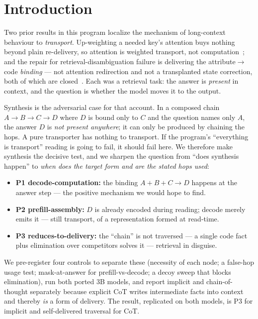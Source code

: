 \documentclass[11pt]{article}
\begin{document}
\section{Introduction}
\label{sec:intro}

Two prior results in this program localize the mechanism of long-context behaviour to
\emph{transport}. Up-weighting a needed key's attention buys nothing beyond plain
re-delivery, so attention is weighted transport, not
computation~\cite{paper3retention}; and the repair for retrieval-disambiguation
failure is delivering the attribute$\to$code \emph{binding} --- not attention
redirection and not a transplanted state correction, both of which are
closed~\cite{paper4arc}. Each was a retrieval task: the answer is \emph{present} in
context, and the question is whether the model moves it to the output.

Synthesis is the adversarial case for that account. In a composed chain
$A\!\to\!B\!\to\!C\!\to\!D$ where $D$ is bound only to $C$ and the question names only
$A$, the answer $D$ is \emph{not present anywhere}; it can only be produced by
chaining the hops. A pure transporter has nothing to transport. If the program's
``everything is transport'' reading is going to fail, it should fail here. We
therefore make synthesis the decisive test, and we sharpen the question from ``does
synthesis happen'' to \emph{when does the target form and are the stated hops used}:
\begin{itemize}
\item \textbf{P1 decode-computation:} the binding $A{+}B{+}C\!\to\!D$ happens at the
answer step --- the positive mechanism we would hope to find.
\item \textbf{P2 prefill-assembly:} $D$ is already encoded during reading; decode
merely emits it --- still transport, of a representation formed at read-time.
\item \textbf{P3 reduces-to-delivery:} the ``chain'' is not traversed --- a single
code fact plus elimination over competitors solves it --- retrieval in disguise.
\end{itemize}
We pre-register four controls to separate these (necessity of each node; a
false-hop usage test; mask-at-answer for prefill-vs-decode; a decoy sweep that blocks
elimination), run both ported 3B models, and report implicit and chain-of-thought
separately because explicit CoT writes intermediate facts into context and thereby
\emph{is} a form of delivery. The result, replicated on both models, is P3 for
implicit and self-delivered traversal for CoT.
\end{document}
